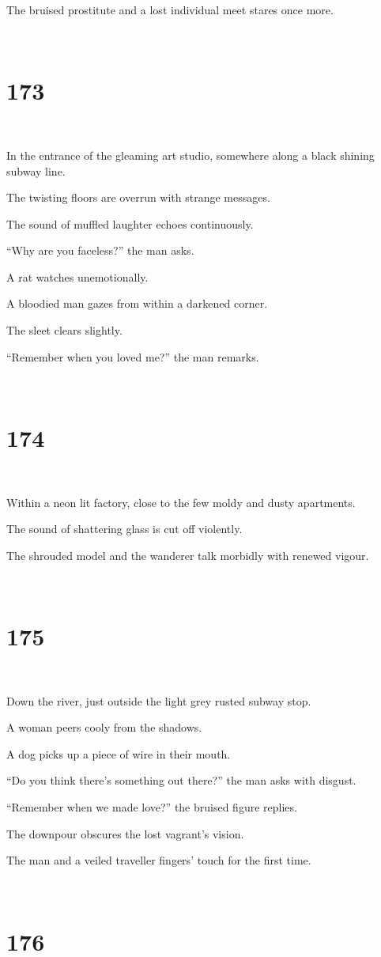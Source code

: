 \documentclass{report}
\begin{document}
The bruised prostitute and a lost individual meet stares once more.

~
\chapter*{173}
~

In the entrance of the gleaming art studio, somewhere along a black shining subway line.

The twisting floors are overrun with strange messages.

The sound of muffled laughter echoes continuously.

``Why are you faceless?'' the man asks.

A rat watches unemotionally.

A bloodied man gazes from within a darkened corner.

The sleet clears slightly.

``Remember when you loved me?'' the man remarks.

~
\chapter*{174}
~

Within a neon lit factory, close to the few moldy and dusty apartments.

The sound of shattering glass is cut off violently.

The shrouded model and the wanderer talk morbidly with renewed vigour.

~
\chapter*{175}
~

Down the river, just outside the light grey rusted subway stop.

A woman peers cooly from the shadows.

A dog picks up a piece of wire in their mouth.

``Do you think there's something out there?'' the man asks with disgust.

``Remember when we made love?'' the bruised figure replies.

The downpour obscures the lost vagrant's vision.

The man and a veiled traveller fingers' touch for the first time.

~
\chapter*{176}
~
\end{document}
